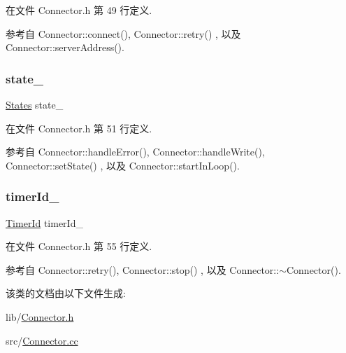 在文件 Connector.\+h 第 49 行定义.



参考自 Connector\+::connect(), Connector\+::retry() , 以及 Connector\+::server\+Address().

\mbox{\label{classmuduo_1_1Connector_a69e113af7e38a28d7e9cbcd1dc0836e3}} 
\subsubsection{\texorpdfstring{state\+\_\+}{state\_}}
{\footnotesize\ttfamily \hyperlink{classmuduo_1_1Connector_a808e5cd4979462d3bbe3070d7d147444}{States} state\+\_\+\hspace{0.3cm}{\ttfamily [private]}}



在文件 Connector.\+h 第 51 行定义.



参考自 Connector\+::handle\+Error(), Connector\+::handle\+Write(), Connector\+::set\+State() , 以及 Connector\+::start\+In\+Loop().

\mbox{\label{classmuduo_1_1Connector_a6e461b999972c0c7798da0070b41d931}} 
\subsubsection{\texorpdfstring{timer\+Id\+\_\+}{timerId\_}}
{\footnotesize\ttfamily \hyperlink{classmuduo_1_1TimerId}{Timer\+Id} timer\+Id\+\_\+\hspace{0.3cm}{\ttfamily [private]}}



在文件 Connector.\+h 第 55 行定义.



参考自 Connector\+::retry(), Connector\+::stop() , 以及 Connector\+::$\sim$\+Connector().



该类的文档由以下文件生成\+:\begin{DoxyCompactItemize}
\item 
lib/\hyperlink{Connector_8h}{Connector.\+h}\item 
src/\hyperlink{Connector_8cc}{Connector.\+cc}\end{DoxyCompactItemize}
